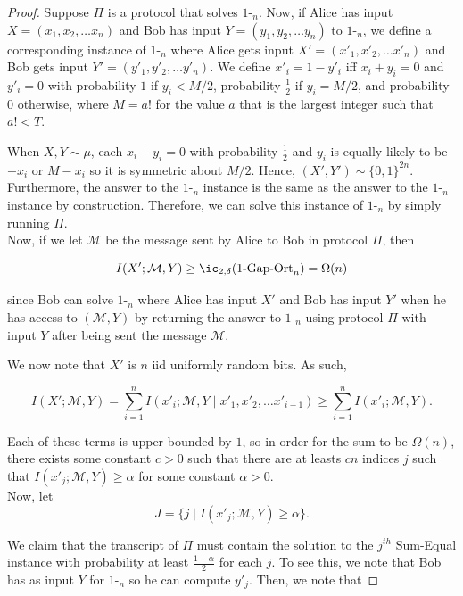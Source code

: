 \begin{proof}
Suppose $\Pi$ is a protocol that solves $1$-\gose$_n$. Now, if Alice has input $X = (x_1, x_2, \dots x_n)$ and Bob has input $Y = (y_1, y_2, \dots y_n)$ to $1$-\gose$_n$, we define a corresponding instance of $1$-\go$_n$ where Alice gets input $X' = (x'_1, x'_2, \dots x'_n)$ and Bob gets input $Y' = (y'_1, y'_2, \dots y'_n)$. {\color{black}We define $x'_i = 1-y'_i$ iff $x_i+y_i = 0$ and $y'_i = 0$ with probability $1$ if $y_i < M/2$, probability $\frac{1}{2}$ if $y_i=M/2$, and probability $0$ otherwise, where $M = a!$ for the value $a$ that is the largest integer such that $a! < T$.}

When $X,Y \sim \mu$, each $x_i+y_i = 0$ with probability $\frac{1}{2}$ and $y_i$ is equally likely to be $-x_i$ or $M-x_i$ so it is symmetric about $M/2$. Hence, $(X',Y') \sim \{0,1\}^{2n}$. Furthermore, the answer to the $1$-\gose$_n$ instance is the same as the answer to the $1$-\go$_n$ instance by construction. Therefore, we can solve this instance of $1$-\go$_n$ by simply running $\Pi$.\\

Now, if we let $\mathcal{M}$ be the message sent by Alice to Bob in protocol $\Pi$, then

$$I(X' ; \mathcal{M}, Y) \ge \ic_{2,\delta}(1\text{-Gap-Ort}_n) = \Omega(n)$$

since Bob can solve $1$-\go$_n$ where Alice has input $X'$ and Bob has input $Y'$ when he has access to $(\mathcal{M},Y)$ by returning the answer to $1$-\gose$_n$ using protocol $\Pi$ with input $Y$ after being sent the message $\mathcal{M}$.

We now note that $X'$ is $n$ iid uniformly random bits. As such,

$$I(X' ; \mathcal{M}, Y) = \sum_{i=1}^n I(x'_i;\mathcal{M}, Y \mid x'_1, x'_2, \dots x'_{i-1}) \ge \sum_{i=1}^n I(x'_i;\mathcal{M}, Y).$$

Each of these terms is upper bounded by $1$, so in order for the sum to be $\Omega(n)$, there exists some constant $c>0$ such that there are at leasts $cn$ indices $j$ such that $I(x'_j;\mathcal{M}, Y) 
\ge \alpha$ for some constant $\alpha > 0$.\\

Now, let
$$J = \{j \mid I(x'_j;\mathcal{M}, Y) \ge \alpha\}.$$

We claim that the transcript of $\Pi$ must contain the solution to the $j^{th}$ Sum-Equal instance with probability {\color{black}at least $\frac{1+\alpha}{2}$} for each $j$. To see this, we note that Bob has as input $Y$ for $1$-\gose$_n$ so he can compute $y'_j$. Then, we note that


\end{proof}
